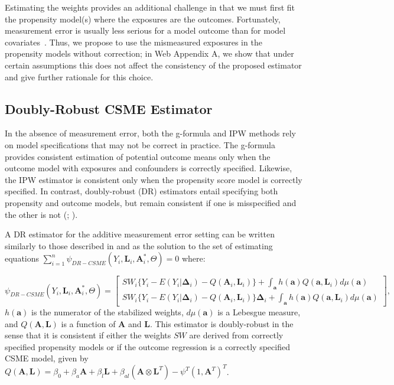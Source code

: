 \documentclass[useAMS,usenatbib,referee]{biom}
\begin{document}
Estimating the weights provides an additional challenge in that we must first fit the propensity model(s) where the exposures are the outcomes. Fortunately, measurement error is usually less serious for a model outcome than for model covariates~\citep{carroll2006}. Thus, we propose to use the mismeasured exposures in the propensity models without correction; in Web Appendix A, we show that under certain assumptions this does not affect the consistency of the proposed estimator and give further rationale for this choice.

\subsection{Doubly-Robust CSME Estimator}

In the absence of measurement error, both the g-formula and IPW methods rely on model specifications that may not be correct in practice. The g-formula provides consistent estimation of potential outcome means only when the outcome model with exposures and confounders is correctly specified. Likewise, the IPW estimator is consistent only when the propensity score model is correctly specified. In contrast, doubly-robust (DR) estimators entail specifying both propensity and outcome models, but remain consistent if one is misspecified and the other is not (\citealp*{robins1994}; \citealp{lunceford2004,bang2005}).

A DR estimator for the additive measurement error setting can be written similarly to those described in \citet{robins2000b} and \citet{neugebauer2005} as the solution to the set of estimating equations $\sum_{i=1}^{n} \psi_{DR-CSME}(Y_{i}, \bm{L}_{i}, \bm{A}^{*}_{i}, \Theta) = 0$ where:

\begin{equation*}
    \psi_{DR-CSME}(Y_{i}, \bm{L}_{i}, \bm{A}^{*}_{i}, \Theta) =
    \begin{bmatrix}
       SW_{i} \{ Y_{i} - E(Y_{i} | \bm{\Delta}_{i}) - Q(\bm{A}_{i}, \bm{L}_{i}) \} + \int_{\bm{a}} h(\bm{a})Q(\bm{a}, \bm{L}_{i})d\mu (\bm{a}) \\
       SW_{i} \{ Y_{i} - E(Y_{i} | \bm{\Delta}_{i}) - Q(\bm{A}_{i}, \bm{L}_{i}) \} \bm{\Delta}_{i} + \int_{\bm{a}} h(\bm{a})Q(\bm{a}, \bm{L}_{i})d\mu (\bm{a})
    \end{bmatrix},
\end{equation*}
$h(\bm{a})$ is the numerator of the stabilized weights, $d\mu (\bm{a})$ is a Lebesgue measure, and $Q(\bm{A}, \bm{L})$ is a function of $\bm{A}$ and $\bm{L}$. This estimator is doubly-robust in the sense that it is consistent if either the weights $SW$ are derived from correctly specified propensity models or if the outcome regression is a correctly specified CSME model, given by $Q(\bm{A}, \bm{L}) = \beta_{0} + \beta_{a}\bm{A} + \beta_{l}\bm{L} + \beta_{al}(\bm{A} \otimes \bm{L}^{T}) - \psi^{T}(1, \bm{A}^{T})^{T}$.
\end{document}
